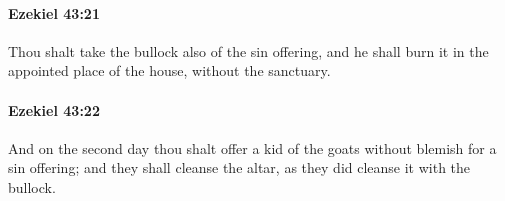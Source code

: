 		\paragraph{Ezekiel 43:21} %
			\label{EZEKIEL-43-21}

			Thou shalt take the bullock also of the sin offering, and he shall burn it in the appointed place of the house, without the sanctuary.


		\paragraph{Ezekiel 43:22} %
			\label{EZEKIEL-43-22}

			And on the second day thou shalt offer a kid of the goats without blemish for a sin offering; and they shall cleanse the altar, as they did cleanse it with the bullock.


